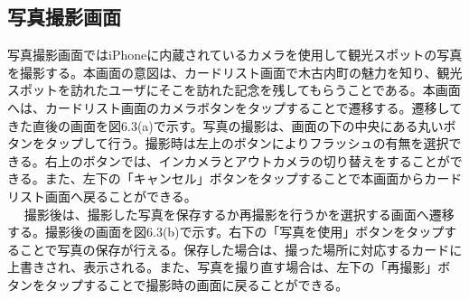 \subsection{写真撮影画面}
写真撮影画面ではiPhoneに内蔵されているカメラを使用して観光スポットの写真を撮影する。本画面の意図は、カードリスト画面で木古内町の魅力を知り、観光スポットを訪れたユーザにそこを訪れた記念を残してもらうことである。本画面へは、カードリスト画面のカメラボタンをタップすることで遷移する。遷移してきた直後の画面を図6.3(a)で示す。写真の撮影は、画面の下の中央にある丸いボタンをタップして行う。撮影時は左上のボタンによりフラッシュの有無を選択できる。右上のボタンでは、インカメラとアウトカメラの切り替えをすることができる。また、左下の「キャンセル」ボタンをタップすることで本画面からカードリスト画面へ戻ることができる。\\　
撮影後は、撮影した写真を保存するか再撮影を行うかを選択する画面へ遷移する。撮影後の画面を図6.3(b)で示す。右下の「写真を使用」ボタンをタップすることで写真の保存が行える。保存した場合は、撮った場所に対応するカードに上書きされ、表示される。また、写真を撮り直す場合は、左下の「再撮影」ボタンをタップすることで撮影時の画面に戻ることができる。
\newpage

